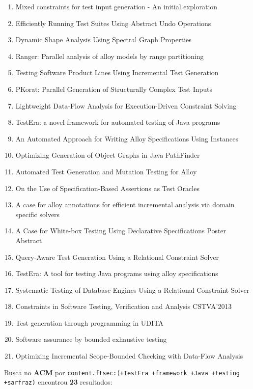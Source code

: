 \begin{enumerate}
\item Mixed constraints for test input generation - An initial exploration
\item Efficiently Running Test Suites Using Abstract Undo Operations
\item Dynamic Shape Analysis Using Spectral Graph Properties
\item Ranger: Parallel analysis of alloy models by range partitioning
\item Testing Software Product Lines Using Incremental Test Generation
\item PKorat: Parallel Generation of Structurally Complex Test Inputs
\item Lightweight Data-Flow Analysis for Execution-Driven Constraint Solving
\item TestEra: a novel framework for automated testing of Java programs
\item An Automated Approach for Writing Alloy Specifications Using Instances
\item Optimizing Generation of Object Graphs in Java PathFinder
\item Automated Test Generation and Mutation Testing for Alloy
\item On the Use of Specification-Based Assertions as Test Oracles
\item A case for alloy annotations for efficient incremental analysis via domain specific solvers
\item A Case for White-box Testing Using Declarative Specifications Poster Abstract
\item Query-Aware Test Generation Using a Relational Constraint Solver
\item TestEra: A tool for testing Java programs using alloy specifications
\item Systematic Testing of Database Engines Using a Relational Constraint Solver
\item Constraints in Software Testing, Verification and Analysis CSTVA'2013
\item Test generation through programming in UDITA
\item Software assurance by bounded exhaustive testing
\item Optimizing Incremental Scope-Bounded Checking with Data-Flow Analysis
\end{enumerate}

Busca no {\bf ACM} por
\texttt{content.ftsec:(+TestEra +framework +Java +testing +sarfraz)}
encontrou {\bf 23}
resultados:

